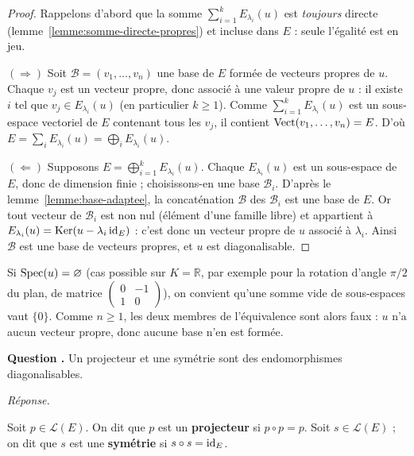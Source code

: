 \documentclass[11pt]{article}
\newcounter{qnum}
\newcommand{\question}[1]{%
\stepcounter{qnum}%
\bigskip
\noindent\textbf{Question \theqnum.} #1\par}
\newcommand{\reponse}{\noindent\textit{Réponse.}\ }
\begin{document}
\begin{proof}
Rappelons d'abord que la somme $\sum_{i=1}^{k}E_{\lambda_i}(u)$ est \emph{toujours} directe (lemme~\ref{lemme:somme-directe-propres}) et incluse dans $E$ : seule l'égalité est en jeu.

$(\Rightarrow)$ Soit $\mathcal{B}=(v_1,\dots,v_n)$ une base de $E$ formée de vecteurs propres de $u$. Chaque $v_j$ est un vecteur propre, donc associé à une valeur propre de $u$ : il existe $i$ tel que $v_j\in E_{\lambda_i}(u)$ (en particulier $k\geq 1$). Comme $\sum_{i=1}^{k}E_{\lambda_i}(u)$ est un sous-espace vectoriel de $E$ contenant tous les $v_j$, il contient $\operatorname{Vect}(v_1,\dots,v_n)=E$. D'où $E=\sum_{i}E_{\lambda_i}(u)=\bigoplus_{i}E_{\lambda_i}(u)$.

$(\Leftarrow)$ Supposons $E=\bigoplus_{i=1}^{k}E_{\lambda_i}(u)$. Chaque $E_{\lambda_i}(u)$ est un sous-espace de $E$, donc de dimension finie ; choisissons-en une base $\mathcal{B}_i$. D'après le lemme~\ref{lemme:base-adaptee}, la concaténation $\mathcal{B}$ des $\mathcal{B}_i$ est une base de $E$. Or tout vecteur de $\mathcal{B}_i$ est non nul (élément d'une famille libre) et appartient à $E_{\lambda_i}(u)=\operatorname{Ker}(u-\lambda_i\operatorname{id}_E)$ : c'est donc un vecteur propre de $u$ associé à $\lambda_i$. Ainsi $\mathcal{B}$ est une base de vecteurs propres, et $u$ est diagonalisable.
\end{proof}

\begin{remarque}
Si $\operatorname{Spec}(u)=\varnothing$ (cas possible sur $K=\mathbb{R}$, par exemple pour la rotation d'angle $\pi/2$ du plan, de matrice $\begin{pmatrix}0&-1\\1&0\end{pmatrix}$), on convient qu'une somme vide de sous-espaces vaut $\{0\}$. Comme $n\geq 1$, les deux membres de l'équivalence sont alors faux : $u$ n'a aucun vecteur propre, donc aucune base n'en est formée.
\end{remarque}

\question{Un projecteur et une symétrie sont des endomorphismes diagonalisables.}
\reponse

\begin{defi}
\label{defi:proj-sym}
Soit $p\in\mathcal{L}(E)$. On dit que $p$ est un \textbf{projecteur} si $p\circ p=p$. Soit $s\in\mathcal{L}(E)$ ; on dit que $s$ est une \textbf{symétrie} si $s\circ s=\operatorname{id}_E$.
\end{defi}
\end{document}
